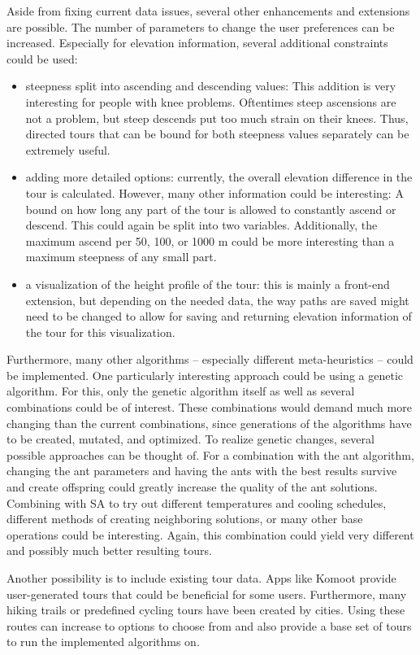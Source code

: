 Aside from fixing current data issues, several other enhancements and extensions are possible.
The number of parameters to change the user preferences can be increased. 
Especially for elevation information, several additional constraints could be used:
\begin{itemize}
	\item steepness split into ascending and descending values: This addition is very interesting for people with knee problems. Oftentimes steep ascensions are not a problem, but steep descends put too much strain on their knees. Thus, directed tours that can be bound for both steepness values separately can be extremely useful.
	\item adding more detailed options: currently, the overall elevation difference in the tour is calculated. However, many other information could be interesting:
	 A bound on how long any part of the tour is allowed to constantly ascend or descend. This could again be split into two variables.
	Additionally, the maximum ascend per 50, 100, or 1000 m could be more interesting than a maximum steepness of any small part.
	\item a visualization of the height profile of the tour: this is mainly a front-end extension, but depending on the needed data, the way paths are saved might need to be changed to allow for saving and returning elevation information of the tour for this visualization.
\end{itemize}

Furthermore, many other algorithms -- especially different meta-heuristics -- could be implemented. 
One particularly interesting approach could be using a genetic algorithm.
For this, only the genetic algorithm itself as well as several combinations could be of interest. 
These combinations would demand much more changing than the current combinations, since generations of the algorithms have to be created, mutated, and optimized. 
To realize genetic changes, several possible approaches can be thought of. 
For a combination with the ant algorithm, changing the ant parameters and having the ants with the best results survive and create offspring could greatly increase the quality of the ant solutions.
Combining with SA to try out different temperatures and cooling schedules, different methods of creating neighboring solutions, or many other base operations could be interesting.
Again, this combination could yield very different and possibly much better resulting tours.

Another possibility is to include existing tour data. 
Apps like Komoot provide user-generated tours that could be beneficial for some users.
Furthermore, many hiking trails or predefined cycling tours have been created by cities.
Using these routes can increase to options to choose from and also provide a base set of tours to run the implemented algorithms on.


